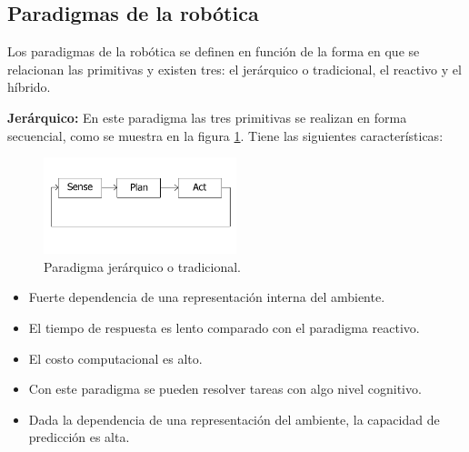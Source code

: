 \documentclass[letterpaper,12pt]{article}
\begin{document}
\subsection{Paradigmas de la robótica}
Los paradigmas de la robótica se definen en función de la forma en que se relacionan las primitivas y existen tres: el jerárquico o tradicional, el reactivo y el híbrido. 

\textbf{Jerárquico:} En este paradigma las tres primitivas se realizan en forma secuencial, como se muestra en la figura  \ref{fig:ParadigmHierarchical}. Tiene las siguientes características:
\begin{figure}
  \centering
  \includegraphics[width=0.5\textwidth]{Figures/Hierarchical.png}
  \caption{Paradigma jerárquico o tradicional.}
  \label{fig:ParadigmHierarchical}
\end{figure}
\begin{itemize}
\item Fuerte dependencia de una representación interna del ambiente. 
\item El tiempo de respuesta es lento comparado con el paradigma reactivo. 
\item El costo computacional es alto.
\item Con este paradigma se pueden resolver tareas con algo nivel cognitivo.
\item Dada la dependencia de una representación del ambiente, la capacidad de predicción es alta.
\end{itemize}
\end{document}
